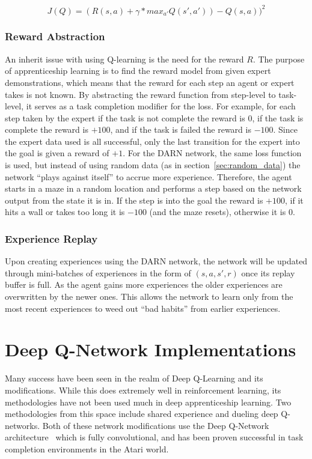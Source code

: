 \documentclass[12pt,american]{report}
\begin{document}
\begin{equation}
     \label{eq:dal-dqn-loss}
     J(Q) =(R(s,a)+\gamma*max_{a'}Q(s',a'))-Q(s,a))^2
\end{equation}
\subsubsection{Reward Abstraction}
An inherit issue with using Q-learning is the need for the reward $R$.  The purpose of apprenticeship learning is to find the reward model from given expert demonstrations, which means that the reward for each step an agent or expert takes is not known. By abstracting the reward function from step-level to task-level, it serves as a task completion modifier for the loss.  For example, for each step taken by the expert if the task is not complete the reward is $0$, if the task is complete the reward is $+100$, and if the task is failed the reward is $-100$.  Since the expert data used is all successful, only the last transition for the expert into the goal is given a reward of $+1$.  For the DARN network, the same loss function is used, but instead of using random data (as in section~\ref{sec:random_data}) the network ``plays against itself'' to accrue more experience.  Therefore, the agent starts in a maze in a random location and performs a step based on the network output from the state it is in.  If the step is into the goal the reward is $+100$, if it hits a wall or takes too long it is $-100$ (and the maze resets), otherwise it is $0$.  

\subsubsection{Experience Replay}
Upon creating experiences using the DARN network, the network will be updated through mini-batches of experiences in the form of $(s,a,s',r)$ once its replay buffer is full.  As the agent gains more experiences the older experiences are overwritten by the newer ones.  This allows the network to learn only from the most recent experiences to weed out ``bad habits'' from earlier experiences. 

\section{Deep Q-Network Implementations}
Many success have been seen in the realm of Deep Q-Learning and its modifications.  While this does extremely well in reinforcement learning, its methodologies have not been used much in deep apprenticeship learning.  Two methodologies from this space include shared experience and dueling deep Q-networks.  Both of these network modifications use the Deep Q-Network architecture~\cite{atari} which is fully convolutional, and has been proven successful in task completion environments in the Atari world.
\end{document}
